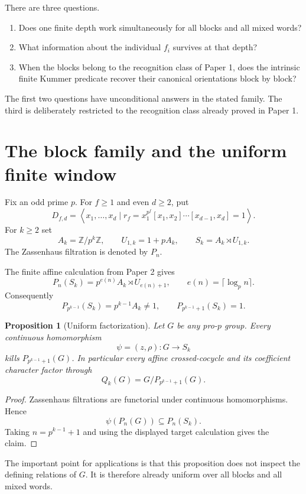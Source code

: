 \documentclass[11pt]{article}
\newtheorem{proposition}[theorem]{Proposition}
\begin{document}
There are three questions.

\begin{enumerate}
\item Does one finite depth work simultaneously for all blocks and all mixed words?
\item What information about the individual $f_i$ survives at that depth?
\item When the blocks belong to the recognition class of Paper 1, does the intrinsic finite Kummer predicate recover their canonical orientations block by block?
\end{enumerate}

The first two questions have unconditional answers in the stated family. The third is deliberately restricted to the recognition class already proved in Paper 1.

\section{The block family and the uniform finite window}

Fix an odd prime $p$. For $f\ge1$ and even $d\ge2$, put
\[
D_{f,d}=\left\langle x_1,\ldots,x_d\mid
r_f=x_1^{p^f}[x_1,x_2]\cdots[x_{d-1},x_d]=1\right\rangle .
\]
For $k\ge2$ set
\[
A_k=\mathbb Z/p^k\mathbb Z,\qquad
U_{1,k}=1+pA_k,\qquad
S_k=A_k\rtimes U_{1,k}.
\]
The Zassenhaus filtration is denoted by $P_n$.

The finite affine calculation from Paper 2 gives
\[
P_n(S_k)=p^{e(n)}A_k\rtimes U_{e(n)+1},
\qquad e(n)=\lceil\log_p n\rceil.
\]
Consequently
\[
P_{p^{k-1}}(S_k)=p^{k-1}A_k\ne1,
\qquad
P_{p^{k-1}+1}(S_k)=1.
\]

\begin{proposition}[Uniform factorization]
Let $G$ be any pro-$p$ group. Every continuous homomorphism
\[
\psi=(z,\rho):G\longrightarrow S_k
\]
kills $P_{p^{k-1}+1}(G)$. In particular every affine crossed-cocycle and its coefficient character factor through
\[
Q_k(G)=G/P_{p^{k-1}+1}(G).
\]
\end{proposition}

\begin{proof}
Zassenhaus filtrations are functorial under continuous homomorphisms. Hence
\[
\psi(P_n(G))\subseteq P_n(S_k).
\]
Taking $n=p^{k-1}+1$ and using the displayed target calculation gives the claim.
\end{proof}

The important point for applications is that this proposition does not inspect the defining relations of $G$. It is therefore already uniform over all blocks and all mixed words.
\end{document}
